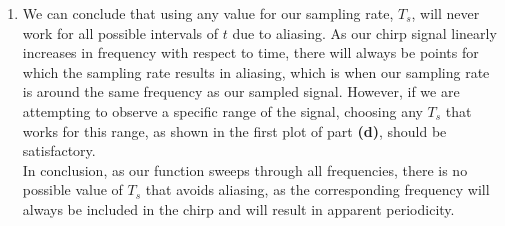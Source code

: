 \documentclass[12pt]{article}
\begin{document}
\begin{enumerate}[label=\textbf{\alph*)}, leftmargin=2.6em]
\item We can conclude that using any value for our sampling rate, $T_s$, will never work for all possible intervals of $t$ due to aliasing. As our chirp signal linearly increases in frequency with respect to time, there will always be points for which the sampling rate results in aliasing, which is when our sampling rate is around the same frequency as our sampled signal. However, if we are attempting to observe a specific range of the signal, choosing any $T_s$ that works for this range, as shown in the first plot of part \textbf{(d)}, should be satisfactory. \\In conclusion, as our function sweeps through all frequencies, there is no possible value of $T_s$ that avoids aliasing, as the corresponding frequency will always be included in the chirp and will result in apparent periodicity.

\end{enumerate}
\end{document}
